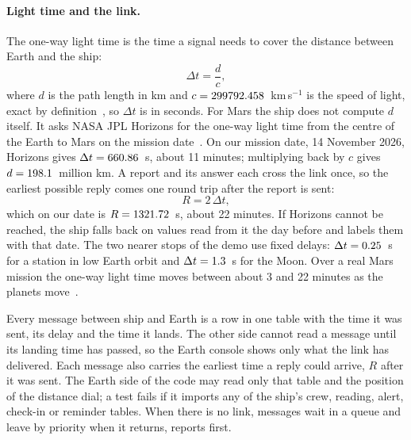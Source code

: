 \paragraph{Light time and the link.}
The one-way light time is the time a signal needs to cover the distance between Earth and the ship:
\begin{equation}\label{eq:lighttime}
  \Delta t = \frac{d}{c},
\end{equation}
where $d$ is the path length in km and $c = 299792.458$~km\,s$^{-1}$ is the speed of light, exact by definition~\cite{bipmSI}, so $\Delta t$ is in seconds. For Mars the ship does not compute $d$ itself. It asks NASA JPL Horizons for the one-way light time from the centre of the Earth to Mars on the mission date~\cite{giorginiHorizons}. On our mission date, 14 November 2026, Horizons gives $\Delta t = 660.86$~s, about 11 minutes; multiplying back by $c$ gives $d = 198.1$~million km. A report and its answer each cross the link once, so the earliest possible reply comes one round trip after the report is sent:
\begin{equation}\label{eq:roundtrip}
  R = 2\,\Delta t ,
\end{equation}
which on our date is $R = 1321.72$~s, about 22 minutes. If Horizons cannot be reached, the ship falls back on values read from it the day before and labels them with that date. The two nearer stops of the demo use fixed delays: $\Delta t = 0.25$~s for a station in low Earth orbit and $\Delta t = 1.3$~s for the Moon. Over a real Mars mission the one-way light time moves between about 3 and 22 minutes as the planets move~\cite{nssdcMars,mcbrayer2022delay}.

Every message between ship and Earth is a row in one table with the time it was sent, its delay and the time it lands. The other side cannot read a message until its landing time has passed, so the Earth console shows only what the link has delivered. Each message also carries the earliest time a reply could arrive, $R$ after it was sent. The Earth side of the code may read only that table and the position of the distance dial; a test fails if it imports any of the ship's crew, reading, alert, check-in or reminder tables. When there is no link, messages wait in a queue and leave by priority when it returns, reports first.

